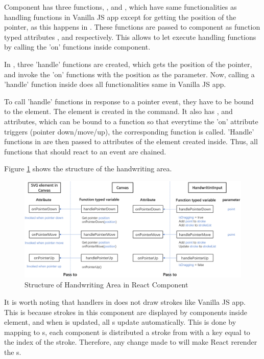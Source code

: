 \documentclass[12pt,twoside]{report}
\begin{document}
Component  has three functions, ,
  and , which have same
functionalities as handling functions in Vanilla JS app except for getting the position of the pointer, as this happens in . These functions are
passed to component  as function typed attributes
,  and  respectively.
This allows  to let  execute handling
functions by calling the 'on' functions inside  component. 

In , three 'handle' functions are created, which gets the position of the pointer, and invoke the 'on' functions with the position as the parameter. Now, calling a 'handle' function inside  does all functionalities same in Vanilla JS app.

To call 'handle' functions in response to a pointer event, they have to be bound
to the  element. The  element is created in the
 command. It also has , 
and  attributes, which can be bound to a function so that
everytime the 'on' attribute triggers (pointer down/move/up), the corresponding
function is called. 'Handle' functions in  are then passed to attributes of the  element created inside. Thus, all functions that should react to an event are chained.
 
Figure \ref{fig:react-handwriting-area} shows the structure of the handwriting area.
\begin{figure}[h]
    \centering
    \includegraphics[width=\linewidth]{figures/react-handwriting-area.png}
    \caption{Structure of Handwriting Area in React Component}
    \label{fig:react-handwriting-area}
\end{figure}

It is worth noting that handlers in  does not draw
strokes like Vanilla JS app. This is because strokes in this component are
displayed by  components inside  element, and when  is updated, all
s update automatically. This is done by mapping  to
s, each  component is distributed a stroke from
 with a key equal to the index of the stroke. Therefore, any
change made to  will make React rerender the s.
\end{document}
